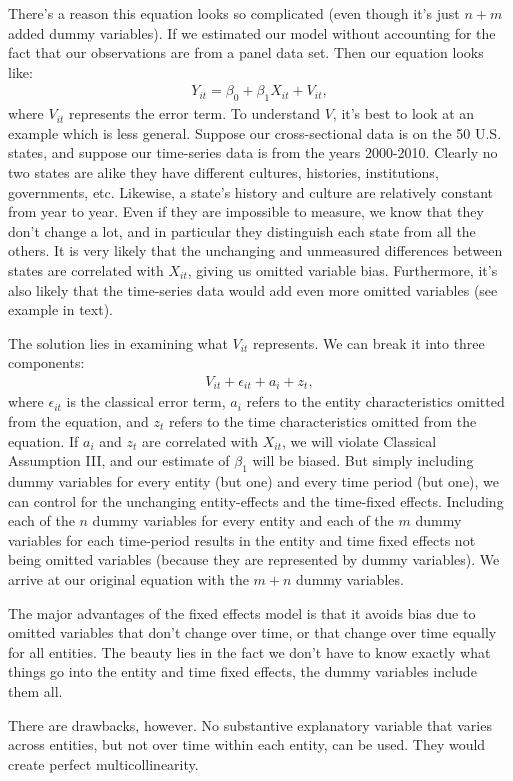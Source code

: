 \documentclass[11pt,twoside,openany]{memoir}
\begin{document}
        There's a reason this equation looks so complicated (even though it's just $n+m$ added dummy variables). If we estimated our model without accounting for the fact that our observations are from a panel data set. Then our equation looks like:
            \begin{equation*}
            \begin{split}
                Y_{it} = \beta_0 + \beta_1 X_{it} + V_{it},
            \end{split}
            \end{equation*}
        where $V_{it}$ represents the error term. To understand $V$, it's best to look at an example which is less general. Suppose our cross-sectional data is on the 50 U.S. states, and suppose our time-series data is from the years 2000-2010. Clearly no two states are alike \textemdash they have different cultures, histories, institutions, governments, etc. Likewise, a state's history and culture are relatively constant from year to year. Even if they are impossible to measure, we know that they don't change a lot, and in particular they distinguish each state from all the others. It is very likely that the unchanging and unmeasured differences between states are correlated with $X_{it}$, giving us omitted variable bias. Furthermore, it's also likely that the time-series data would add even more omitted variables (see example in text).

        The solution lies in examining what $V_{it}$ represents. We can break it into three components:
            \begin{equation*}
            \begin{split}
                V_{it} + \epsilon_{it} + a_i + z_t,
            \end{split}
            \end{equation*}
        where $\epsilon_{it}$ is the classical error term, $a_i$ refers to the entity characteristics omitted from the equation, and $z_t$ refers to the time characteristics omitted from the equation. If $a_i$ and $z_t$ are correlated with $X_{it}$, we will violate Classical Assumption III, and our estimate of $\beta_1$ will be biased. But simply including dummy variables for every entity (but one) and every time period (but one), we can control for the unchanging entity-effects and the time-fixed effects. Including each of the $n$ dummy variables for every entity and each of the $m$ dummy variables for each time-period results in the entity and time fixed effects not being omitted variables (because they are represented by dummy variables). We arrive at our original equation with the $m+n$ dummy variables.

        The major advantages of the fixed effects model is that it avoids bias due to omitted variables that don't change over time, or that change over time equally for all entities. The beauty lies in the fact we don't have to know exactly what things go into the entity and time fixed effects, the dummy variables include them all.

        There are drawbacks, however. No substantive explanatory variable that varies across entities, but not over time within each entity, can be used. They would create perfect multicollinearity.
\end{document}
